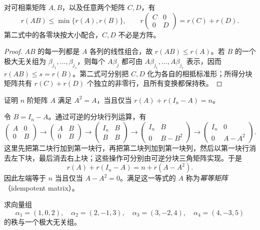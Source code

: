 \begin{proposition}
\label{prop:matrix-rank-product-block}
对可相乘矩阵 $A,B$，以及任意两个矩阵 $C,D$，有
\[
    r(AB)\leq\min\{r(A),r(B)\},\qquad
    r\begin{pmatrix}C&0\\0&D\end{pmatrix}=r(C)+r(D).
\]
第二式中的各零块按大小配合，$C,D$ 不必是方阵。
\end{proposition}

\begin{proof}
$AB$ 的每一列都是 $A$ 各列的线性组合，故 $r(AB)\leq r(A)$。若 $B$ 的一个极大无关组为 $\beta_{j_1},\ldots,\beta_{j_s}$，则每个 $A\beta_j$ 都可由 $A\beta_{j_1},\ldots,A\beta_{j_s}$ 表示，因而 $r(AB)\leq s=r(B)$。第二式可分别把 $C,D$ 化为各自的相抵标准形；所得分块矩阵共有 $r(C)+r(D)$ 个独立的非零行，且所有变换都保持秩。
\end{proof}

\begin{example}
\label{ex:idempotent-rank-criterion}
证明 $n$ 阶矩阵 $A$ 满足 $A^2=A$，当且仅当 $r(A)+r(I_n-A)=n$。
\end{example}

\begin{solve}
令 $B=I_n-A$。通过可逆的分块行列运算，有
\[
    \begin{pmatrix}A&0\\0&B\end{pmatrix}
    \longrightarrow\begin{pmatrix}A&B\\0&B\end{pmatrix}
    \longrightarrow\begin{pmatrix}I_n&B\\B&B\end{pmatrix}
    \longrightarrow\begin{pmatrix}I_n&B\\0&B-B^2\end{pmatrix}
    \longrightarrow\begin{pmatrix}I_n&0\\0&A-A^2\end{pmatrix}.
\]
这里先把第二块行加到第一块行，再把第二块列加到第一块列，然后以第一块行消去左下块，最后消去右上块；这些操作可分别由可逆分块三角矩阵实现。于是
\[
    r(A)+r(I_n-A)=n+r(A-A^2).
\]
因此左端等于 $n$ 当且仅当 $A-A^2=0$。满足这一等式的 $A$ 称为\emph{幂等矩阵}（idempotent matrix）。
\end{solve}

\begin{example}
\label{ex:vector-rank-by-columns}
求向量组
\[
    \alpha_1=(1,0,2),\quad\alpha_2=(2,-1,3),\quad
    \alpha_3=(3,-2,4),\quad\alpha_4=(4,-3,5)
\]
的秩与一个极大无关组。
\end{example}

